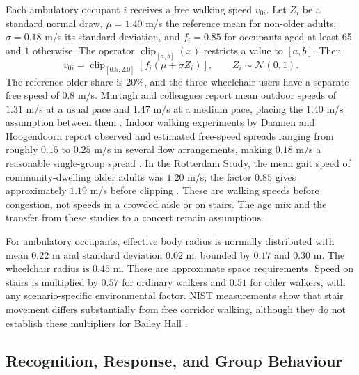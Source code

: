 \documentclass[11pt,a4paper]{article}
\newcommand{\clip}{\operatorname{clip}}
\begin{document}
Each ambulatory occupant $i$ receives a free walking speed $v_{0i}$. Let $Z_i$ be a standard normal draw, $\mu=1.40$ m/s the reference mean for non-older adults, $\sigma=0.18$ m/s its standard deviation, and $f_i=0.85$ for occupants aged at least 65 and $1$ otherwise. The operator $\clip_{[a,b]}(x)$ restricts a value to $[a,b]$. Then
\begin{equation}\label{eq:speed}
v_{0i}=\clip_{[0.5,2.0]}\!\left[f_i(\mu+\sigma Z_i)\right],
\qquad Z_i\sim\mathcal N(0,1).
\end{equation}
The reference older share is $20\%$, and the three wheelchair users have a separate free speed of $0.8$ m/s. Murtagh and colleagues report mean outdoor speeds of $1.31$ m/s at a usual pace and $1.47$ m/s at a medium pace, placing the $1.40$ m/s assumption between them \cite{murtagh}. Indoor walking experiments by Daamen and Hoogendoorn report observed and estimated free-speed spreads ranging from roughly $0.15$ to $0.25$ m/s in several flow arrangements, making $0.18$ m/s a reasonable single-group spread \cite{daamen}. In the Rotterdam Study, the mean gait speed of community-dwelling older adults was $1.20$ m/s; the factor $0.85$ gives approximately $1.19$ m/s before clipping \cite{dommers,bohannon}. These are walking speeds before congestion, not speeds in a crowded aisle or on stairs. The age mix and the transfer from these studies to a concert remain assumptions.

For ambulatory occupants, effective body radius is normally distributed with mean $0.22$ m and standard deviation $0.02$ m, bounded by $0.17$ and $0.30$ m. The wheelchair radius is $0.45$ m. These are approximate space requirements. Speed on stairs is multiplied by $0.57$ for ordinary walkers and $0.51$ for older walkers, with any scenario-specific environmental factor. NIST measurements show that stair movement differs substantially from free corridor walking, although they do not establish these multipliers for Bailey Hall \cite{nist}.

\subsection{Recognition, Response, and Group Behaviour}
\end{document}
